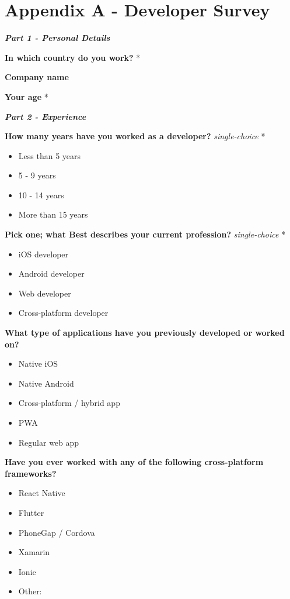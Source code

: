 \documentclass[a4paper,12pt]{article}
\renewcommand{\arraystretch}{1.5}
\begin{document}
\setlength{\parindent}{0pt}
\setlength{\arrayrulewidth}{0.3mm}
\setlength{\tabcolsep}{4pt}
\renewcommand{\arraystretch}{1.5}

\section{Appendix A - Developer Survey} 
\label{Appendix_devSurvey}

\textbf{\textit{Part 1 - Personal Details}}

\textbf{In which country do you work?} *

\quad

\textbf{Company name}

\quad

\textbf{Your age} *

\quad

\quad

\textbf{\textit{Part 2 - Experience}}

\textbf{How many years have you worked as a developer?} \textit{single-choice} *
\begin{itemize}
    \item Less than 5 years
    \item 5 - 9 years
    \item 10 - 14 years
    \item More than 15 years
\end{itemize}

\textbf{Pick one; what Best describes your current profession?} \textit{single-choice} *
\begin{itemize}
    \item iOS developer
    \item Android developer
    \item Web developer
    \item Cross-platform developer
\end{itemize}

\textbf{What type of applications have you previously developed or worked on?}
\begin{itemize}
    \item Native iOS
    \item Native Android
    \item Cross-platform / hybrid app
    \item PWA
    \item Regular web app
\end{itemize}

\textbf{Have you ever worked with any of the following cross-platform frameworks?}
\begin{itemize}
    \item React Native
    \item Flutter
    \item PhoneGap / Cordova
    \item Xamarin
    \item Ionic
    \item Other:
\end{itemize}
\quad
\end{document}

